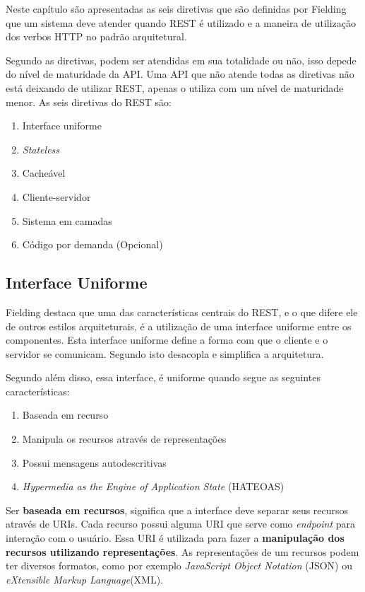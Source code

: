 Neste capítulo são apresentadas as seis diretivas que são definidas por Fielding
que um sistema deve atender quando REST é utilizado e a maneira de utilização dos
verbos HTTP no padrão arquitetural. 

Segundo \cite{fielding} as diretivas, podem ser atendidas em sua totalidade
ou não, isso depede do nível de maturidade da API. Uma API que não atende todas as diretivas 
não está deixando de utilizar REST, apenas o utiliza com um nível de maturidade
menor. As seis diretivas do REST são:

\begin{enumerate}
  \item Interface uniforme
  \item \textit{Stateless}
  \item Cacheável
  \item Cliente-servidor
  \item Sistema em camadas
  \item Código por demanda (Opcional)
\end{enumerate}

\subsection{Interface Uniforme}

Fielding \cite{fielding} destaca que uma das características centrais do REST, e o que difere ele 
de outros estilos arquiteturais, é a utilização de uma interface uniforme entre os componentes. 
Esta interface uniforme define a forma com que o cliente e o servidor se comunicam. Segundo \cite{todd}
isto desacopla e simplifica a arquitetura.

Segundo \cite{todd} além disso, essa interface, é uniforme quando segue as seguintes características:

\begin{enumerate}
  \item Baseada em recurso
  \item Manipula os recursos através de representações
  \item Possui mensagens autodescritivas
  \item \textit{Hypermedia as the Engine of Application State} (HATEOAS)
\end{enumerate}

Ser \textbf{baseada em recursos}, significa que a interface deve separar seus
recursos através de URIs. 
Cada recurso possui alguma URI que serve como \textit{endpoint} para interação com o usuário. 
Essa URI é utilizada para fazer a \textbf{manipulação dos recursos utilizando representações}.
As representações de um recursos podem ter diversos formatos, como por exemplo 
\textit{JavaScript Object Notation} (JSON) ou \textit{eXtensible Markup Language}(XML).

